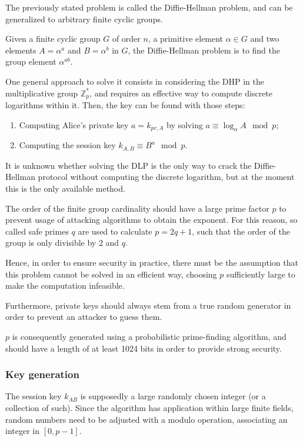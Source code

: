 The previously stated problem is called the Diffie-Hellman problem, and can be generalized to arbitrary finite cyclic groups.

Given a finite cyclic group $G$ of order $n$, a primitive element $\alpha \in G$ and two elements $A = \alpha^a$ and $B = \alpha^b$ in $G$, the Diffie-Hellman problem is to find the group element $\alpha^{ab}$.

One general approach to solve it consists in considering the DHP in the multiplicative group $\mathbb{Z}^*_p$, and requires an effective way to compute discrete logarithms within it. Then, the key can be found with those steps:
\begin{enumerate}
	\item Computing Alice's private key $a = k_{pr, A}$ by solving $a \equiv \log_\alpha A \mod p$;
	\item Computing the session key $k_{A, B} \equiv B^a \mod p$.
\end{enumerate}

It is unknown whether solving the DLP is the only way to crack the Diffie-Hellman protocol without computing the discrete logarithm, but at the moment this is the only available method. 

The order of the finite group cardinality should have a large prime factor $p$ to prevent usage of attacking algorithms to obtain the exponent. For this reason, so called safe primes $q$ are used to calculate $p = 2q + 1$, such that the order of the group is only divisible by 2 and $q$.

Hence, in order to ensure security in practice, there must be the assumption that this problem cannot be solved in an efficient way, choosing $p$ sufficiently large to make the computation infeasible. 

Furthermore, private keys should always stem from a true random generator in order to prevent an attacker to guess them.

$p$ is consequently generated using a probabilistic prime-finding algorithm, and should have a length of at least 1024 bits in order to provide strong security.

\subsubsection{Key generation}
The session key $k_{AB}$ is supposedly a large randomly chosen integer (or a collection of such). Since the algorithm has application within large finite fields, random numbers need to be adjusted with a modulo operation, associating an integer in $[0, p - 1]$.

